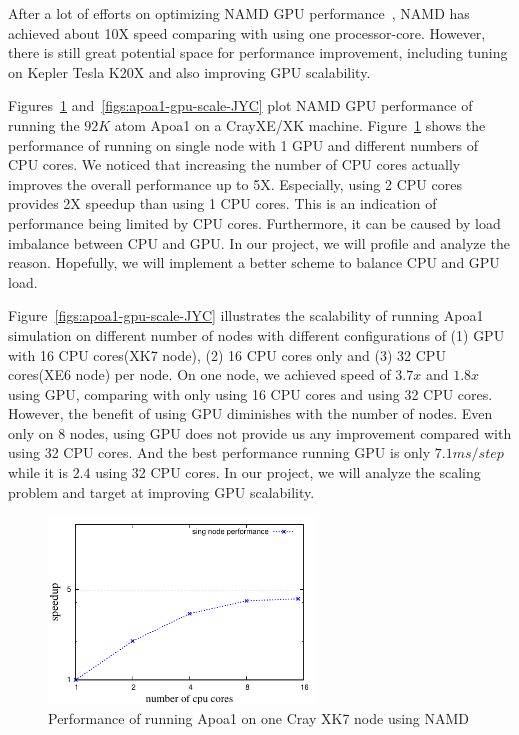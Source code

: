 After a lot of efforts on optimizing NAMD GPU performance~\cite{phillips_stone_namd_cuda}, NAMD has achieved 
about 10X speed comparing with using one processor-core. However, there is still great
potential space for performance improvement, including tuning on Kepler Tesla K20X and
also improving GPU scalability.

Figures~\ref{figs:apoa1-gpu-singlenode-JYC} and~\ref{figs:apoa1-gpu-scale-JYC}
plot NAMD GPU performance of running the $92K$ atom Apoa1 on a CrayXE/XK machine.
Figure~\ref{figs:apoa1-gpu-singlenode-JYC} shows the performance of running on 
single node with 1 GPU and different numbers of CPU cores. We noticed that increasing
the number of CPU cores actually improves the overall performance up to 5X. Especially, 
using 2 CPU cores provides 2X speedup than using 1 CPU cores.
This is an indication of performance being limited by CPU cores. Furthermore, 
it can be caused by load imbalance between CPU and GPU. In our project, we will profile
and analyze the reason. Hopefully, we will implement a better scheme to balance CPU and GPU load.

Figure~\ref{figs:apoa1-gpu-scale-JYC} illustrates the scalability of 
running Apoa1 simulation on different number of nodes with different configurations of 
(1) GPU with 16 CPU cores(XK7 node), (2) 16 CPU cores only and (3) 32 CPU cores(XE6 node) per node.
On one node, we achieved speed of $3.7x$ and $1.8x$ using GPU, comparing with only using 16 CPU cores
and using 32 CPU cores. However, the benefit of using GPU diminishes with the number of nodes.
Even only on 8 nodes, using GPU does not provide us any improvement compared with using 32 CPU cores.
And the best performance running GPU is only $7.1ms/step$ while it is $2.4$ using 32 CPU cores.
In our project, we will analyze the scaling problem and target at improving GPU scalability.

\begin{figure}[h]
\centering
\includegraphics[width=2.8in]{figs/gpu-singlenode}
\caption{Performance of running Apoa1 on one Cray XK7 node using NAMD}
\label{figs:apoa1-gpu-singlenode-JYC}
\vspace{-0.2cm}
\end{figure}

